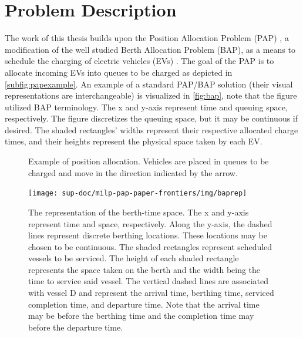 \documentclass[ee,thesis]{usuthesis}
\begin{document}
\section{Problem Description}
\label{sec:problem-description}
The work of this thesis builds upon the Position Allocation Problem (PAP) \cite{qarebagh-2019-optim-sched}, a
modification of the well studied Berth Allocation Problem (BAP), as a means to schedule the charging of electric
vehicles (EVs) \cite{buhrkal-2011-model-discr,frojan-2015-contin-berth,imai-2001-dynam-berth}. The goal of the PAP is
to allocate incoming EVs into queues to be charged as depicted in \autoref{subfig:papexample}. An example of a standard
PAP/BAP solution (their visual representations are interchangeable) is visualized in \autoref{fig:bap}, note that the
figure utilized BAP terminology. The x and y-axis represent time and queuing space, respectively. The figure discretizes
the queuing space, but it may be continuous if desired. The shaded rectangles' widths represent their respective
allocated charge times, and their heights represent the physical space taken by each EV.

\begin{figure}[htpb]
  \centering
  
  \caption{Example of position allocation. Vehicles are placed in queues to be charged and move in the direction
    indicated by the arrow.}
  \label{subfig:papexample}
\end{figure}

\begin{figure}
  \centering
  \texttt{[image: sup-doc/milp-pap-paper-frontiers/img/baprep]}
  \caption{The representation of the berth-time space. The x and y-axis represent time and space, respectively. Along the y-axis, the dashed lines represent discrete berthing locations. These locations may be chosen to be continuous. The shaded rectangles represent scheduled vessels to be serviced. The height of each shaded rectangle represents the space taken on the berth and the width being the time to service said vessel. The vertical dashed lines are associated with vessel D and represent the arrival time, berthing time, serviced completion time, and departure time. Note that the arrival time may be before the berthing time and the completion time may before the departure time.}
  \label{fig:bap}
\end{figure}
\end{document}
